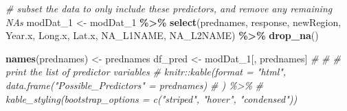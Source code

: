\documentclass[
]{article}
\newenvironment{Shaded}{\begin{snugshade}}{\end{snugshade}}
\newcommand{\CommentTok}[1]{\textcolor[rgb]{0.56,0.35,0.01}{\textit{#1}}}
\newcommand{\FunctionTok}[1]{\textcolor[rgb]{0.13,0.29,0.53}{\textbf{#1}}}
\newcommand{\NormalTok}[1]{#1}
\newcommand{\OtherTok}[1]{\textcolor[rgb]{0.56,0.35,0.01}{#1}}
\newcommand{\SpecialCharTok}[1]{\textcolor[rgb]{0.81,0.36,0.00}{\textbf{#1}}}
\begin{document}
\begin{Shaded}
\begin{Highlighting}[]
\CommentTok{\# subset the data to only include these predictors, and remove any remaining NAs }
\NormalTok{modDat\_1 }\OtherTok{\textless{}{-}}\NormalTok{ modDat\_1 }\SpecialCharTok{\%\textgreater{}\%} 
  \FunctionTok{select}\NormalTok{(prednames, response, newRegion, Year.x, Long.x, Lat.x, NA\_L1NAME, NA\_L2NAME) }\SpecialCharTok{\%\textgreater{}\%} 
  \FunctionTok{drop\_na}\NormalTok{()}

\FunctionTok{names}\NormalTok{(prednames) }\OtherTok{\textless{}{-}}\NormalTok{ prednames}
\NormalTok{df\_pred }\OtherTok{\textless{}{-}}\NormalTok{ modDat\_1[, prednames]}
\CommentTok{\# }
\CommentTok{\# \# print the list of predictor variables}
\CommentTok{\# knitr::kable(format = "html", data.frame("Possible\_Predictors" = prednames)}
\CommentTok{\# ) \%\textgreater{}\%}
\CommentTok{\#   kable\_styling(bootstrap\_options = c("striped", "hover", "condensed")) }
\end{Highlighting}
\end{Shaded}
\end{document}
